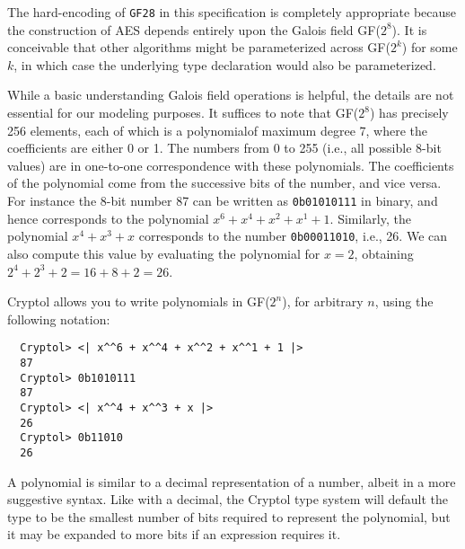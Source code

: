 The hard-encoding of \texttt{GF28} in this specification is completely
appropriate because the construction of AES depends entirely upon the
Galois field GF($2^8$).  It is conceivable that other algorithms might
be parameterized across GF($2^k$) for some $k$, in which case the
underlying type declaration would also be parameterized.

While a basic understanding Galois field operations is helpful, the
details are not essential for our modeling purposes.  It suffices to
note that GF($2^8$) has precisely 256 elements, each of which is a
polynomial\indPoly of maximum degree 7, where the coefficients are
either 0 or 1.  The numbers from 0 to 255 (i.e., all possible 8-bit
values) are in one-to-one correspondence with these polynomials.  The
coefficients of the polynomial come from the successive bits of the
number, and vice versa.  For instance the 8-bit number 87 can be
written as {\tt 0b01010111} in binary, and hence corresponds to the
polynomial $x^6 + x^4 + x^2 + x^1 + 1$. Similarly, the polynomial $x^4
+ x^3 + x$ corresponds to the number {\tt 0b00011010}, i.e., 26. We
can also compute this value by evaluating the polynomial for $x=2$,
obtaining $2^4+2^3+2 = 16+8+2 = 26$.

Cryptol allows you to write polynomials in GF($2^n$), for arbitrary
$n$, using the following notation:
\begin{Verbatim}
  Cryptol> <| x^^6 + x^^4 + x^^2 + x^^1 + 1 |>
  87
  Cryptol> 0b1010111
  87
  Cryptol> <| x^^4 + x^^3 + x |>
  26
  Cryptol> 0b11010
  26
\end{Verbatim}

A polynomial is similar to a decimal representation of a number,
albeit in a more suggestive syntax.  Like with a decimal, the Cryptol
type system will default the type to be the smallest number of bits
required to represent the polynomial, but it may be expanded to more
bits if an expression requires it.

